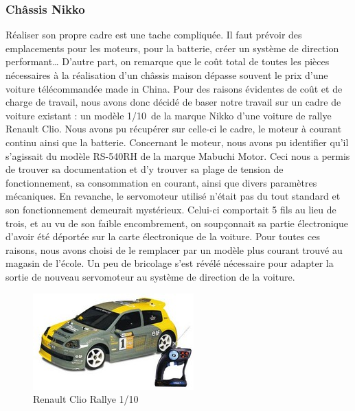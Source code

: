 \documentclass[a4paper,12pt]{report}
\begin{document}
			\subsubsection{Châssis Nikko}
			Réaliser son propre cadre est une tache compliquée. Il faut prévoir des emplacements pour les moteurs, pour la batterie, créer un système de direction performant… D’autre part, on remarque que le coût total de toutes les pièces nécessaires à la réalisation d’un châssis maison dépasse souvent le prix d’une voiture télécommandée made in China.
Pour des raisons évidentes de coût et de charge de travail, nous avons donc décidé de baser notre travail sur un cadre de voiture existant : un modèle 1/10\ieme~de la marque Nikko d’une voiture de rallye Renault Clio. Nous avons pu récupérer sur celle-ci le cadre, le moteur à courant continu ainsi que la batterie.
Concernant le moteur, nous avons pu identifier qu’il s’agissait du modèle RS-540RH de la marque Mabuchi Motor. Ceci nous a permis de trouver sa documentation et d’y trouver sa plage de tension de fonctionnement, sa consommation en courant, ainsi que divers paramètres mécaniques.
En revanche, le servomoteur utilisé n’était pas du tout standard et son fonctionnement demeurait mystérieux. Celui-ci comportait 5 fils au lieu de trois, et au vu de son faible encombrement, on soupçonnait sa partie électronique d’avoir été déportée sur la carte électronique de la voiture. Pour toutes ces raisons, nous avons choisi de le remplacer par un modèle plus courant trouvé au magasin de l’école. Un peu de bricolage s’est révélé nécessaire pour adapter la sortie de nouveau servomoteur au système de direction de la voiture.

\begin{figure}[!h]
	\begin{center}
		\includegraphics[scale=0.8]{images/renaultclio.jpg}
	\end{center}
	\caption{Renault Clio Rallye 1/10\ieme} 
	\label{renaultclio}
\end{figure}

			
\end{document}
